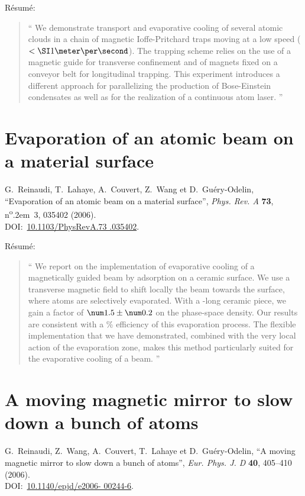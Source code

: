 \vspace{1ex}
Résumé:
\begin{quote}\enquote{
We demonstrate transport and evaporative cooling of several atomic clouds in a chain of magnetic Ioffe-Pritchard traps moving at a low speed ($<\mps{1}$). The trapping scheme relies on the use of a magnetic guide for transverse confinement and of magnets fixed on a conveyor belt for longitudinal trapping. This experiment introduces a different approach for parallelizing the production of Bose-Einstein condensates as well as for the realization of a continuous atom laser.%
}\end{quote}

\section{Evaporation of an atomic beam on a material surface}
\noindent 
{\sc G.~{Reinaudi}}, {\sc T.~{Lahaye}}, {\sc A.~{Couvert}}, {\sc Z.~{Wang}} et
  {\sc D.~{Gu{\'e}ry-Odelin}}, \enquote{{Evaporation of an atomic beam on a
  material surface}}, {\em Phys. Rev. A\/} {\bf 73},
  n\textsuperscript{o}\kern.2em\relax~3, 035402 (2006).
\\
  DOI:~\href{http://dx.doi.org/10.1103/PhysRevA.73.035402}{10.1103/PhysRevA.73%
.035402}.

\vspace{1ex}
Résumé:
\begin{quote}\enquote{
We report on the implementation of evaporative cooling of a magnetically guided beam by adsorption on a ceramic surface. We use a transverse magnetic field to shift locally the beam towards the surface, where atoms are selectively evaporated. With a -long ceramic piece, we gain a factor of $\valpm{1.5}{0.2}$ on the phase-space density. Our results are consistent with a \% efficiency of this evaporation process. The flexible implementation that we have demonstrated, combined with the very local action of the evaporation zone, makes this method particularly suited for the evaporative cooling of a beam.%
}\end{quote}

\section{A moving magnetic mirror to slow down a bunch of atoms}
\noindent
{\sc G.~{Reinaudi}}, {\sc Z.~{Wang}}, {\sc A.~{Couvert}}, {\sc T.~{Lahaye}} et
  {\sc D.~{Gu{\'e}ry-Odelin}}, \enquote{{A moving magnetic mirror to slow down
  a bunch of atoms}}, {\em Eur. Phys. J. D\/} {\bf 40}, 405--410 (2006).
\\
  DOI:~\href{http://dx.doi.org/10.1140/epjd/e2006-00244-6}{10.1140/epjd/e2006-%
00244-6}.


